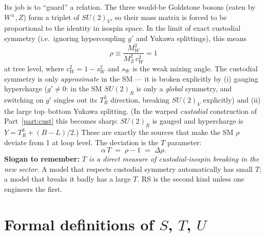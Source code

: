\documentclass[11pt]{article}
\newcommand{\sw}{s_W}
\newcommand{\swsq}{s_W^2}
\newcommand{\cwsq}{c_W^2}
\newcommand{\SUR}{SU(2)_R}
\theoremstyle{definition}
\begin{document}
Its job is to ``guard'' a relation. The three would-be Goldstone bosons (eaten by
$W^\pm, Z$) form a triplet of $SU(2)_V$, so their mass matrix is forced to be
proportional to the identity in isospin space. In the limit of exact custodial
symmetry (i.e.\ ignoring hypercoupling $g'$ and Yukawa splittings), this means
\begin{equation}
\rho \equiv \frac{M_W^2}{M_Z^2\,\cwsq} = 1
\label{eq:rho}
\end{equation}
at tree level, where $\cwsq = 1-\swsq$ and $\sw$ is the weak mixing angle. The
custodial symmetry is only \emph{approximate} in the SM --- it is broken
explicitly by (i) gauging hypercharge ($g'\neq 0$: in the SM $\SUR$ is only a
\emph{global} symmetry, and switching on $g'$ singles out its $T^3_R$ direction,
breaking $SU(2)_V$ explicitly) and (ii) the large top--bottom Yukawa splitting.
(In the warped \emph{custodial} construction of Part~\ref{part:cust} this becomes
sharp: $\SUR$ is gauged and hypercharge is $Y = T^3_R + (B\!-\!L)/2$.) These are exactly the
sources that make the SM $\rho$ deviate from 1 at loop level. The deviation is
the $T$ parameter:
\begin{equation}
\alpha\,T \;=\; \rho - 1 \;=\; \Delta\rho .
\label{eq:Tisrho}
\end{equation}
\textbf{Slogan to remember:} \emph{$T$ is a direct measure of custodial-isospin
breaking in the new sector.} A model that respects custodial symmetry
automatically has small $T$; a model that breaks it badly has a large $T$. RS is
the second kind unless one engineers the first.

\section{Formal definitions of $S$, $T$, $U$}
\label{sec:STUdef}
\end{document}
